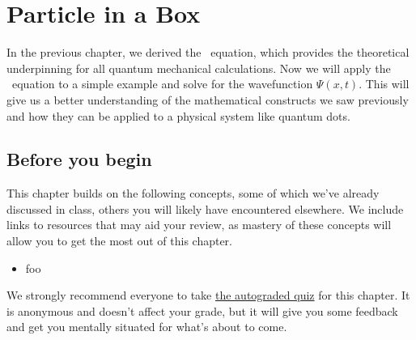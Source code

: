 

%

\chapter{Particle in a Box} \label{ch:box}

In the previous chapter, we derived the \Sch\ equation, which provides the theoretical underpinning for all quantum mechanical calculations. 
Now we will apply the \Sch\ equation to a simple example and solve for the wavefunction $\Psi(x,t)$. 
This will give us a better understanding of the mathematical constructs we saw previously and how they can be applied to a physical system like quantum dots.


\section{Before you begin}

This chapter builds on the following concepts, some of which we've already discussed in class, others you will likely have encountered elsewhere.
We include links to resources that may aid your review, as mastery of these concepts will allow you to get the most out of this chapter.

\begin{itemize}
	\item foo
\end{itemize}

\begin{tcolorbox}[colframe=PaloAlto, colbacktitle=PaloAlto!20!white, title=Pre-check quiz]
	We strongly recommend everyone to take \href{TODO}{the autograded quiz} for this chapter.
	It is anonymous and doesn't affect your grade, but it will give you some feedback and get you mentally situated for what's about to come.
\end{tcolorbox}


